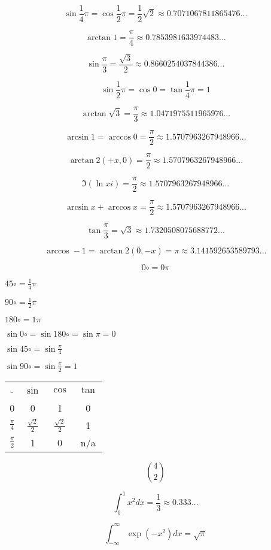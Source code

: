\documentclass{article}
\begin{document}
$$\sin\frac{1}{4}\pi = \cos\frac{1}{2}\pi = \frac{1}{2}\sqrt{2}\approx0.7071067811865476...$$

$$\arctan1=\frac{\pi}{4}\approx0.7853981633974483...$$

$$\sin\frac{\pi}{3}=\frac{\sqrt{3}}{2}\approx0.8660254037844386...$$

$$\sin\frac{1}{2}\pi = \cos0 = \tan\frac{1}{4}\pi = 1$$

$$\arctan\sqrt{3} = \frac{\pi}{3}\approx1.0471975511965976...$$

$$\arcsin1 = \arccos0 = \frac{\pi}{2}\approx1.5707963267948966...$$

$$\arctan2(+x,0) = \frac{\pi}{2}\approx1.5707963267948966...$$

$$\Im(\ln xi) = \frac{\pi}{2}\approx1.5707963267948966...$$

$$\arcsin x + \arccos x = \frac{\pi}{2} \approx1.5707963267948966...$$

$$\tan\frac{\pi}{3}=\sqrt{3}\approx1.7320508075688772...$$

$$\arccos-1 = \arctan2(0,-x) = \pi\approx3.141592653589793...$$



$$0\circ = 0\pi$$

$45\circ = \frac{1}{4}\pi$

$90\circ = \frac{1}{2}\pi$

$180\circ = 1\pi$

$\sin 0\circ = \sin 180\circ = \sin\pi = 0$

$\sin 45\circ = \sin\frac{\pi}{4}$

$\sin 90\circ = \sin\frac{\pi}{2} = 1$

\begin{tabular}{c c c c}
-               & $\sin$               & $\cos$               & $\tan$\\
0               & 0                    & 1                    & 0\\
$\frac{\pi}{4}$ & $\frac{\sqrt{2}}{2}$ & $\frac{\sqrt{2}}{2}$ & 1\\
$\frac{\pi}{2}$ & 1                    & 0                    & n/a
\end{tabular}

$$\binom{4}{2}$$

$$\int_0^1x^2dx=\frac{1}{3}\approx0.333...$$

$$\int_{-\infty}^\infty\exp(-x^2)dx = \sqrt{\pi}$$
\end{document}
